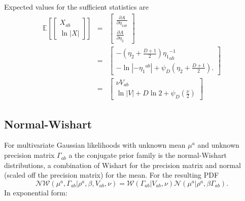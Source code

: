 \documentclass[aps,showpacs,twocolumn,prd,superscriptaddress,nofootinbib]{revtex4}
\newcommand{\E}[1]{{\mathbb E}_{#1}\!}
\begin{document}
Expected values for the sufficient statistics are
\begin{eqnarray*}
\E{}\left[ 
\begin{bmatrix}
  X_{ab}\\[.7ex]
  \ln\left|X\right|
\end{bmatrix}
\right]
&=&
\begin{bmatrix}
  \frac{\partial A}{\partial\eta_{1ab}}\\[.7ex]
  \frac{\partial A}{\partial\eta_{2}}  
\end{bmatrix}\\
&=&
\begin{bmatrix}
-\left(\eta_2+\frac{D+1}2\right){\eta_1}^{-1}_{ab}\\[.7ex]
-\ln\left|{-{\eta_1}^{ab}}\right|+\psi_D\left(\eta_2+\frac{D+1}2\right).
\end{bmatrix}\\
&=&
\begin{bmatrix}
  \nu V_{ab}\\[0ex]
  \ln|V|+D\ln2+\psi_D\left(\frac\nu2\right)
\end{bmatrix}
\end{eqnarray*}

\subsection{Normal-Wishart}
For multivariate Gaussian likelihoods with unknown mean $\mu^a$ and unknown precision matrix $\Gamma_{ab}$ a the conjugate prior family is the normal-Wishart distributions, a combination of Wishart for the precision matrix and normal (scaled off the precision matrix) for the mean. For the resulting PDF
\begin{equation}
\mathcal{NW}(\mu^a,\Gamma_{ab}|\rho^a,\beta,V_{ab},\nu)=\mathcal{W}(\Gamma_{ab}|V_{ab},\nu)\mathcal{N}(\mu^a|\rho^a,\beta \Gamma_{ab}).
\end{equation}
In exponential form:
\end{document}

